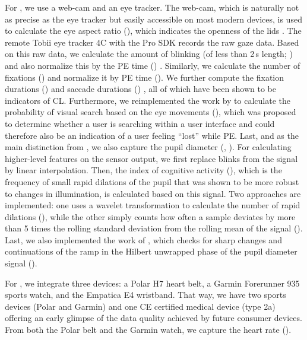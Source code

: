 \documentclass[output=paper]{langsci/langscibook}
\begin{document}
For , we use a web-cam and an eye tracker. The web-cam, which is naturally not as precise as the eye tracker but easily accessible on most modern devices, is used to calculate the eye aspect ratio (\ear{}), which indicates the openness of the lids \citep{soukupova2016real}.
The remote Tobii eye tracker 4C with the Pro SDK records the raw gaze data. Based on this raw data, we calculate the amount of blinking (of less than 2\,s length; \blinkamount{}) and also normalize this by the PE time (\normblinkamount{})  \citep{van2001eye}. Similarly, we calculate the number of fixations (\fixamount{}) and normalize it by PE time (\normfixamount{}).
We further compute the fixation durations (\fixdur{}) and saccade durations (\saccdur{})  \citep{doherty2010eye,moorkens_correlations_2015}, all of which have been shown to be indicators of CL.
Furthermore, we reimplemented the work by \citet{goldberg1999computer} to calculate the probability of visual search based on the eye movements (\searchprob{}), which was proposed to determine whether a user is searching within a user interface and could therefore also be an indication of a user feeling ``lost'' while PE.
Last, and as the main distinction from \citet{herbig2019mt}, we also capture the pupil diameter (\rawpupil{}, \citealt{obrien_eye-tracking_2006}). For calculating higher-level features on the sensor output, we first replace blinks from the signal by linear interpolation. Then, the index of cognitive activity (\ica{}{}), which is the frequency of small rapid dilations of the pupil \citep{demberg2016frequency} that was shown to be more robust to changes in illumination, is calculated based on this signal. Two approaches are implemented: one uses a wavelet transformation to calculate the number of rapid dilations (), while the other simply counts how often a sample deviates by more than 5 times the rolling standard deviation from the rolling mean of the signal ().
Last, we also implemented the work of \citet{hossain2014understanding}, which checks for sharp changes and continuations of the ramp in the Hilbert unwrapped phase of the pupil diameter signal (\hilbert{}).


For , we integrate three devices: a Polar H7 heart belt, a Garmin Forerunner 935 sports watch, and the Empatica E4 wristband. That way, we have two sports devices (Polar and Garmin) and one CE certified medical device (type 2a) offering an early glimpse of the data quality achieved by future consumer devices. %
From both the Polar belt and the Garmin watch, we capture the heart rate (\hr{}{}).
\end{document}
